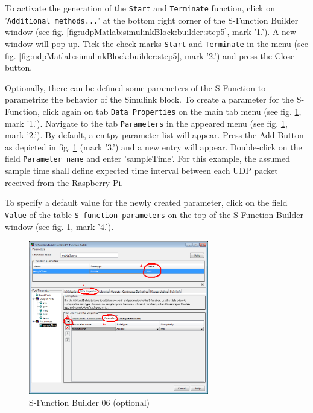 To activate the generation of the \texttt{Start} and \texttt{Terminate} function, click on '\texttt{Additional methods...}' at the bottom right corner of the S-Function Builder window (see fig. \ref{fig:udpMatlab:simulinkBlock:builder:step5}, mark '1.'). A new window will pop up. Tick the check marks \texttt{Start} and \texttt{Terminate} in the menu (see fig. \ref{fig:udpMatlab:simulinkBlock:builder:step5}, mark '2.') and press the Close-button.

Optionally, there can be defined some parameters of the S-Function to parametrize the behavior of the Simulink block. To create a parameter for the S-Function, click again on tab \texttt{Data Properties} on the main tab menu (see fig. \ref{fig:udpMatlab:simulinkBlock:builder:step6}, mark '1.'). Navigate to the tab \texttt{Parameters} in the appeared menu (see fig. \ref{fig:udpMatlab:simulinkBlock:builder:step6}, mark '2.'). By default, a emtpy parameter list will appear. Press the Add-Button as depicted in fig. \ref{fig:udpMatlab:simulinkBlock:builder:step6} (mark '3.') and a new entry will appear. Double-click on the field \texttt{Parameter name} and enter 'sampleTime'. For this example, the assumed sample time shall define expected time interval between each UDP packet received from the Raspberry Pi.

To specify a default value for the newly created parameter, click on the field \texttt{Value} of the table \texttt{S-function parameters} on the top of the S-Function Builder window (see fig. \ref{fig:udpMatlab:simulinkBlock:builder:step6}, mark '4.').

\begin{figure}[H]
    \centering
    \includegraphics[width=0.7\textwidth]{fig/ch-matlab-lib/sFuncBuilder_matlabBuilder_03optional}
    \caption{S-Function Builder 06 (optional)}
    \label{fig:udpMatlab:simulinkBlock:builder:step6}
\end{figure}


